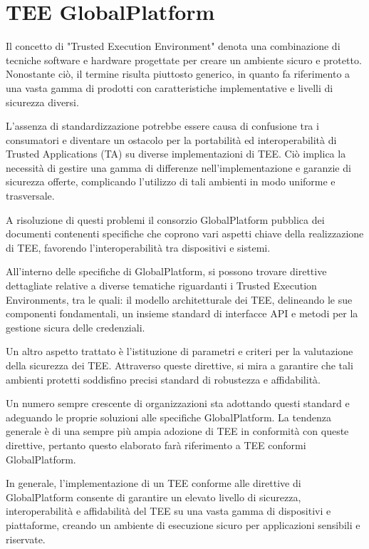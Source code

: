 \documentclass[12pt,italian]{report}
\begin{document}
	\newpage
	
	\section{TEE GlobalPlatform}
	\label{sec:GlobalPlatform}
	Il concetto di "Trusted Execution Environment" denota una combinazione di tecniche software e hardware progettate per creare un ambiente sicuro e protetto. Nonostante ciò, il termine risulta piuttosto generico, in quanto fa riferimento a una vasta gamma di prodotti con caratteristiche implementative e livelli di sicurezza diversi.
	
	L'assenza di standardizzazione potrebbe essere causa di confusione tra i consumatori e diventare un ostacolo per la portabilità ed interoperabilità di Trusted Applications (TA) su diverse implementazioni di TEE. Ciò implica la necessità di gestire una gamma di differenze nell'implementazione e garanzie di sicurezza offerte, complicando l'utilizzo di tali ambienti in modo uniforme e trasversale.
	
	A risoluzione di questi problemi il consorzio GlobalPlatform pubblica dei documenti contenenti specifiche che coprono vari aspetti chiave della realizzazione di TEE, favorendo l'interoperabilità tra dispositivi e sistemi.
	
	All'interno delle specifiche di GlobalPlatform, si possono trovare direttive dettagliate relative a diverse tematiche riguardanti i Trusted Execution Environments, tra le quali: il modello architetturale dei TEE, delineando le sue componenti fondamentali, un insieme standard di interfacce API e metodi per la gestione sicura delle credenziali.
	
	\bigbreak
	
	Un altro aspetto trattato è l'istituzione di parametri e criteri per la valutazione della sicurezza dei TEE. Attraverso queste direttive, si mira a garantire che tali ambienti protetti soddisfino precisi standard di robustezza e affidabilità.
	
	Un numero sempre crescente di organizzazioni sta adottando questi standard e adeguando le proprie soluzioni alle specifiche GlobalPlatform. La tendenza generale è di una sempre più ampia adozione di TEE in conformità con queste direttive, pertanto questo elaborato farà riferimento a TEE conformi GlobalPlatform.
	
	\bigbreak 
	
	In generale, l'implementazione di un TEE conforme alle direttive di GlobalPlatform consente di garantire un elevato livello di sicurezza, interoperabilità e affidabilità del TEE su una vasta gamma di dispositivi e piattaforme, creando un ambiente di esecuzione sicuro per applicazioni sensibili e riservate.
	
\end{document}

